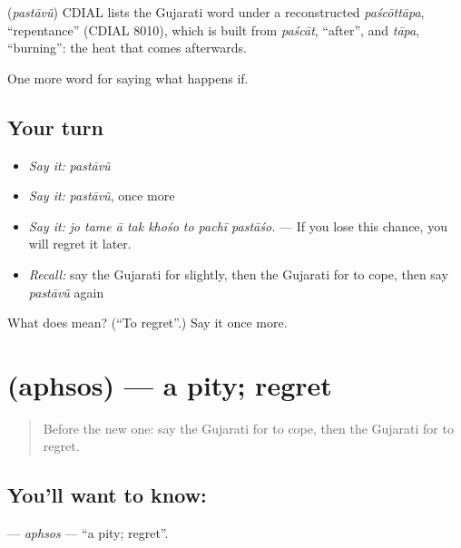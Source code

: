 \begin{cousinweb}
\textbf{} (\emph{pastāvũ}) CDIAL lists the Gujarati word under a reconstructed \emph{paścōttāpa}, \textquotedblleft{}repentance\textquotedblright{} (CDIAL 8010), which is built from \emph{paścāt}, \textquotedblleft{}after\textquotedblright{}, and \emph{tāpa}, \textquotedblleft{}burning\textquotedblright{}: the heat that comes afterwards.
\end{cousinweb}

\begin{grammarlens}[title={What you've built}]
One more word for saying what happens if.
\end{grammarlens}

\subsection*{Your turn}
\begin{itemize}
\raggedright
  \item \emph{Say it:} \emph{pastāvũ}
  \item \emph{Say it:} \emph{pastāvũ}, once more
  \item \emph{Say it:} \emph{jo tame ā tak khośo to pachī pastāśo.} — If you lose this chance, you will regret it later.
  \item \emph{Recall:} say the Gujarati for slightly, then the Gujarati for to cope, then say \emph{pastāvũ} again
\end{itemize}

\begin{tcolorbox}[breakable,colback=teal!4,colframe=teal!35!black,title={Before you move on}]
What does  mean? (\textquotedblleft{}To regret\textquotedblright{}.) Say it once more.
\end{tcolorbox}
\section[\texorpdfstring{\gu{અફસોસ} (aphsos)}{અફસોસ (aphsos)}]{ (aphsos) — a pity; regret}

\label{lesson:GU-C381-aphsos}



\begin{quote}
Before the new one: say the Gujarati for to cope, then the Gujarati for to regret.
\end{quote}

\subsection*{You'll want to know: }
\textbf{} — \emph{aphsos} — \textquotedblleft{}a pity; regret\textquotedblright{}.

